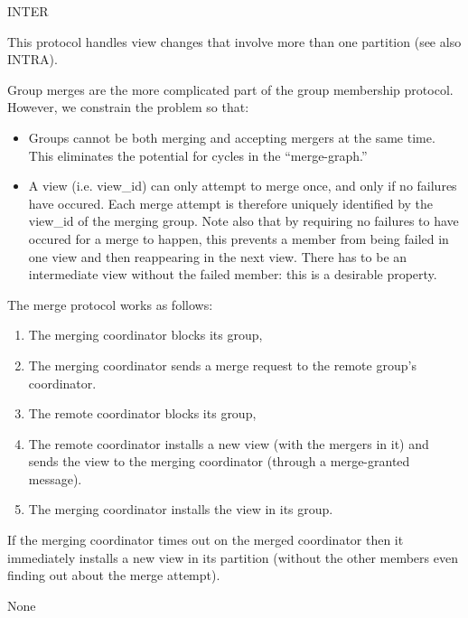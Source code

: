 %
%
%
\begin{Layer}{INTER}

This protocol handles view changes that involve more than one
partition (see also INTRA).

\begin{Protocol}
Group merges are the more complicated part of the group membership
protocol.  However, we constrain the problem so that:
\begin{itemize}
\item
Groups cannot be both merging and accepting mergers at the same time.
This eliminates the potential for cycles in the ``merge-graph.''
\item
A view (i.e. view\_id) can only attempt to merge once, and only if no
failures have occured.  Each merge attempt is therefore uniquely
identified by the view\_id of the merging group.  Note also that by
requiring no failures to have occured for a merge to happen, this
prevents a member from being failed in one view and then reappearing
in the next view.  There has to be an intermediate view without the
failed member: this is a desirable property.
\end{itemize}
The merge protocol works as follows:
\begin{enumerate}
\item
The merging coordinator blocks its group,
\item
The merging coordinator sends a merge request to the remote group's
coordinator.
\item
The remote coordinator blocks its group,
\item
The remote coordinator installs a new view (with the mergers in it) and
sends the view to the merging coordinator (through a merge-granted
message).
\item
The merging coordinator installs the view in its group.
\end{enumerate}
If the merging coordinator times out on the merged coordinator then it
immediately installs a new view in its partition (without the other members
even finding out about the merge attempt).
\end{Protocol}

\begin{Parameters}
\item None
\end{Parameters}


\end{Layer}
